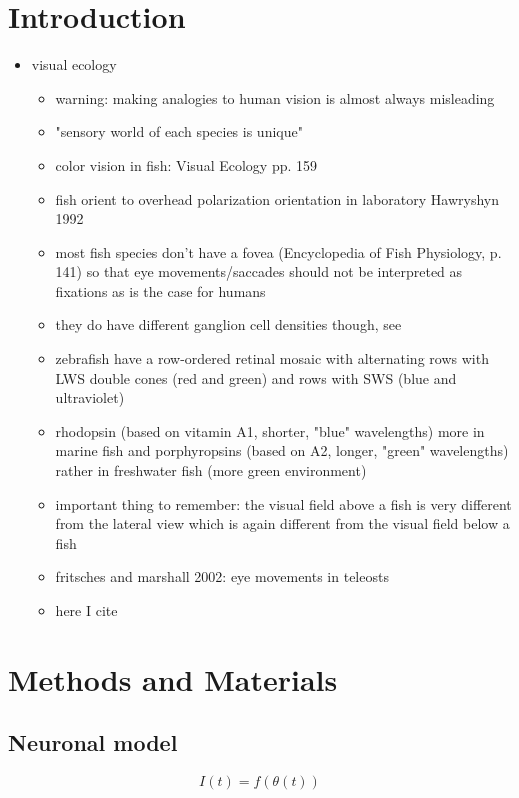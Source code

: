 \documentclass[a4paper,10pt,hidelinks]{scrreprt}
\begin{document}
	\chapter{Introduction}
	\begin{itemize}
		\item visual ecology
		\begin{itemize}
			\item warning: making analogies to human vision is almost always misleading
			\item "sensory world of each species is unique"
			\item color vision in fish: Visual Ecology pp. 159
			\item fish orient to overhead polarization orientation in laboratory Hawryshyn 1992
			\item most fish species don't have a fovea (Encyclopedia of Fish 
			Physiology, p. 141) so that eye movements/saccades should not be 
			interpreted as fixations as is the case for humans
			\item they do have different ganglion cell densities though, see 
			\cite{Pita2015}
			\item zebrafish have a row-ordered retinal mosaic with alternating rows with LWS double cones (red and green) and rows with SWS (blue and ultraviolet)
			\item rhodopsin (based on vitamin A1, shorter, "blue" wavelengths) more in marine fish and porphyropsins (based on A2, longer, "green" wavelengths) rather in freshwater fish (more green environment)
			\item important thing to remember: the visual field above a fish is very different from the lateral view which is again different from the visual field below a fish
			\item fritsches and marshall 2002: eye movements in teleosts
			\item here I cite \cite{Tytell2008}
		\end{itemize}
	\end{itemize}
	\newpage
	\chapter{Methods and Materials}
	\section{Neuronal model}
	\begin{equation}
	I(t) = f(\theta (t))
	\label{eq:input}
	\end{equation}
	
\end{document}
